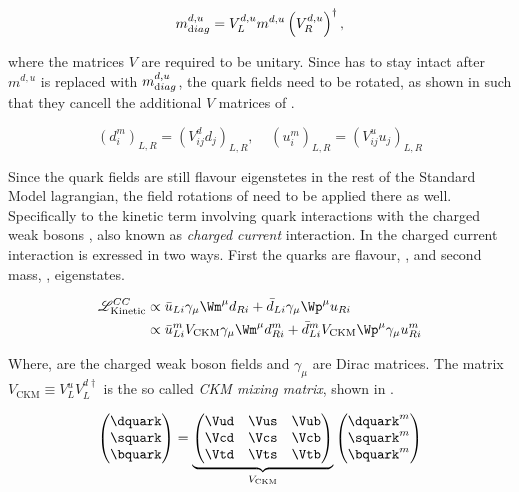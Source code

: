 \begin{equation}
  m^{d,u}_{\text diag} = V_L^{d,u} m^{d,u} \left(V_R^{d,u}\right)^{\dagger},
  \label{diagM}
\end{equation}

\noindent where the matrices $V$ are required to be unitary. Since  has to stay intact after $m^{d,u}$ is replaced with
$m^{d,u}_{\text diag}$, the quark fields need to be rotated, as shown in  such that they cancell the additional $V$ matrices
of .

\begin{equation}
  \left( d_{i}^m \right)_{L,R} = \left( V^d_{ij} d_{j} \right)_{L,R}, \;\;\;\; \left( u_{i}^m \right)_{L,R} = \left( V^u_{ij} u_{j} \right)_{L,R}
  \label{quark_rotation}
\end{equation}

\noindent Since the quark fields are still flavour eigenstetes in the rest of the Standard Model lagrangian,
the field rotations of  need to be applied there as well. Specifically
to the kinetic term involving quark interactions with the charged weak bosons \Wpm, also known as {\it charged current}
interaction. In  the charged current interaction is exressed in two ways.
First the quarks are flavour, , and second mass, , eigenstates.

\begin{subequations}
  \label{CClagrangian}
  \begin{align}
    \mathscr{L}_{\text{Kinetic}}^{CC} & \propto \bar{u}_{Li} \gamma_\mu {\Wm}^\mu d_{Ri} + \bar{d}_{Li} \gamma_\mu {\Wp}^\mu u_{Ri}  \label{CClagrangianInt} \\
                                      & \propto \bar{u}_{Li}^m  {V_{\text{CKM}}} \gamma_\mu {\Wm}^\mu d_{Ri}^m + \bar{d}_{Li}^m V_{\text{CKM}} {\Wp}^\mu \gamma_\mu u_{Ri}^m \label{CClagrangianMass}
  \end{align}
\end{subequations}

\noindent Where, \Wpm are the charged weak boson fields and $\gamma_\mu$ are Dirac matrices.
The matrix $V_{\text{CKM}} \equiv V^u_LV^{d\dagger}_L$ is the so called {\it CKM mixing matrix}, shown in .

\begin{equation}
  \begin{pmatrix} \dquark \\ \squark \\ \bquark  \end{pmatrix} =
  \underbrace{\begin{pmatrix} \Vud & \Vus & \Vub \\ \Vcd & \Vcs & \Vcb \\ \Vtd & \Vts & \Vtb \end{pmatrix}}_{V_{\text{CKM}}}
    \begin{pmatrix} \dquark^m \\ \squark^m \\ \bquark^m  \end{pmatrix}
  \label{quark_field_rotation}
  \end{equation}

